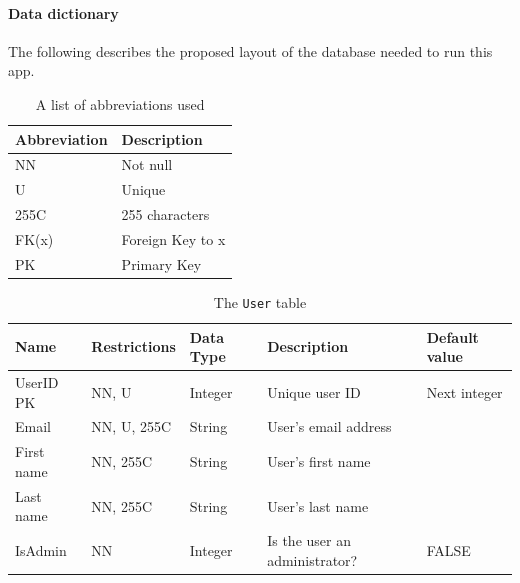 \documentclass[a4paper, 11pt, titlepage]{article}
\begin{document}
\paragraph{Data dictionary}
The following describes the proposed layout of the database needed to run this app. 
\begin{table}[H]
  \centering
  \caption{A list of abbreviations used}
    \begin{tabular}{ll}
    \hline
    Abbreviation & Description \\
    \hline
    NN    & Not null \\
    U     & Unique \\
    255C  & 255 characters \\
    FK(x) & Foreign Key to x \\
    PK    & Primary Key \\
    \hline
    \end{tabular}%
  \label{tab:abbreviations}%
\end{table}%

\begin{table}[H]
  \centering
  \caption{The \texttt{User} table}
    \begin{tabularx}{\textwidth}{lllXl}
    \hline
    Name  & Restrictions & Data Type & Description & Default value \\
    \hline
    UserID PK & NN, U & Integer & Unique user ID & Next integer \\
    Email & NN, U, 255C & String & User's email address &  \\
    First name & NN, 255C & String & User's first name &  \\
    Last name & NN, 255C & String & User's last name &  \\
    IsAdmin & NN    & Integer & Is the user an administrator? & FALSE \\
    \hline
    \end{tabularx}%
  \label{tab:dd:User}%
\end{table}%
\end{document}
